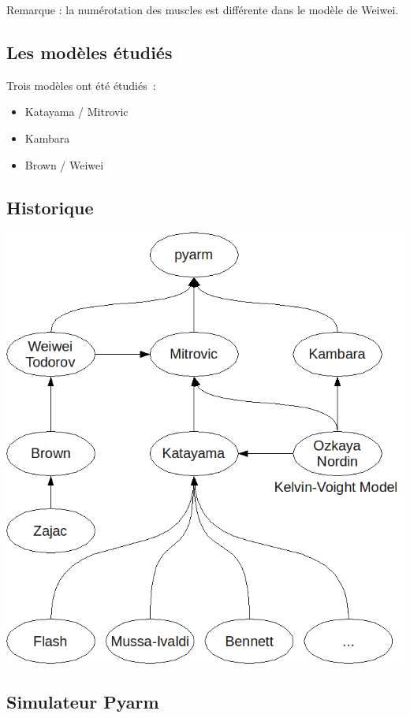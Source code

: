 \documentclass[pdftex,a4paper,11pt]{article}
\begin{document}
Remarque : la numérotation des muscles est différente dans le modèle de Weiwei.

\subsection{Les modèles étudiés}
Trois modèles ont été étudiés~:
\begin{itemize}
    \item Katayama / Mitrovic \cite{katayama1993, ozkaya1999, mitrovic10, mitrovic2008, mitrovic2009}
    \item Kambara \cite{kambara2009, ozkaya1999}
    \item Brown / Weiwei \cite{brown1999, li2006, li2004, todorov2005}
\end{itemize}


\subsection{Historique}

\begin{center}
        \includegraphics[width=.80\linewidth]{fig/bib}
\end{center}

\subsection{Simulateur Pyarm}
\end{document}
